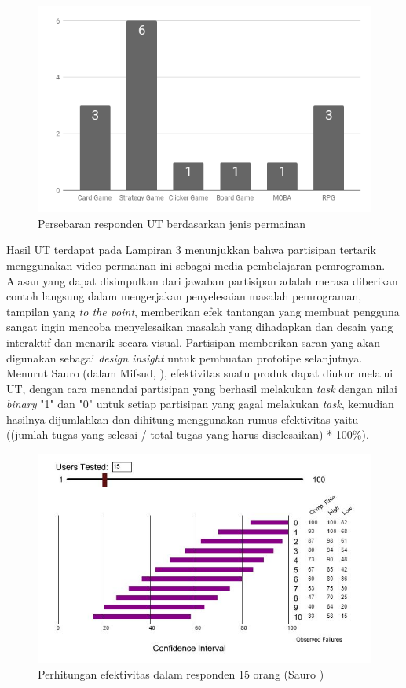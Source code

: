 	\begin{figure}
		\includegraphics[width=\linewidth]{pics/UT/jenis-game}
		\caption{Persebaran responden UT berdasarkan jenis permainan}
		\centering
	\end{figure}
	Hasil UT terdapat pada Lampiran 3 menunjukkan bahwa partisipan tertarik menggunakan video permainan ini sebagai media pembelajaran pemrograman. Alasan yang dapat disimpulkan dari jawaban partisipan adalah merasa diberikan contoh langsung dalam mengerjakan penyelesaian masalah pemrograman, tampilan yang \textit{to the point}, memberikan efek tantangan yang membuat pengguna sangat ingin mencoba menyelesaikan masalah yang dihadapkan dan desain yang interaktif dan menarik secara visual. Partisipan memberikan saran yang akan digunakan sebagai \textit{design insight} untuk pembuatan prototipe selanjutnya.
	\linebreak\linebreak
	Menurut Sauro (dalam Mifsud, \citeyear{article.sauroMifsud}), efektivitas suatu produk dapat diukur melalui UT, dengan cara menandai partisipan yang berhasil melakukan \textit{task} dengan nilai \textit{binary} "1" dan "0" untuk setiap partisipan yang gagal melakukan \textit{task}, kemudian hasilnya dijumlahkan dan dihitung menggunakan rumus efektivitas yaitu ((jumlah tugas yang selesai / total tugas yang harus diselesaikan) * 100\%).
	\begin{figure}
		\centering
		\includegraphics[width=\linewidth]{pics/perhitungan-sauro}
		\caption{Perhitungan efektivitas dalam responden 15 orang (Sauro \citeyear{article.sauroWhat})}
	\end{figure}
